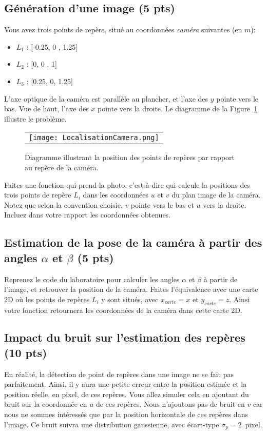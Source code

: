 \documentclass[12pt]{article}
\begin{document}
\subsection{Génération d'une image (5 pts)}
Vous avez trois points de repère, situé au coordonnées \emph{caméra} suivantes (en $m$):
\begin{itemize}
\item $L_1$ : [-0.25, 0 , 1.25]
\item $L_2$ : [0,       0   , 1]
\item $L_3$ : [0.25, 0, 1.25]
\end{itemize}
L'axe optique de la caméra est parallèle au plancher, et l'axe des $y$ pointe vers le bas. Vue de haut, l'axe des $x$ pointe vers la droite. Le diagramme de la Figure~\ref{DiagLocalisation} illustre le problème.

\begin{figure}[ht]
 \begin{center}
  \begin{tabular}{c}
    \texttt{[image: LocalisationCamera.png]} 
  \end{tabular}
 \end{center}
\vspace{-0.3in}
 \caption{Diagramme illustrant la position des points de repères par rapport au repère de la caméra.}
 \label{DiagLocalisation}
\end{figure}

Faites une fonction qui prend la photo, c'est-à-dire qui calcule la positions des trois points de repère $L_i$ dans les coordonnées $u$ et $v$ du plan image de la caméra. Notez que selon la convention choisie, $v$ pointe vers le bas et $u$ vers la droite. Incluez dans votre rapport les coordonnées obtenues.

\subsection{Estimation de la pose de la caméra à partir des angles $\alpha$ et $\beta$ (5 pts)}
Reprenez le code du laboratoire pour calculer les angles $\alpha$ et $\beta$ à partir de l'image, et retrouver la position de la caméra. Faites l'équivalence avec une carte 2D où les points de repères $L_i$ y sont situés, avec $x_{carte}=x$ et $y_{carte}=z$. Ainsi votre fonction retournera les coordonnées de la caméra dans cette carte 2D.

\subsection{Impact du bruit sur l'estimation des repères (10 pts)}
En réalité, la détection de point de repères dans une image ne se fait pas parfaitement. Ainsi, il y aura une petite erreur entre la position estimée et la position réelle, en pixel, de ces repères. Vous allez simuler cela en ajoutant du bruit sur la coordonnée en $u$ de ces repères. Nous n'ajoutons pas de bruit en $v$ car nous ne sommes intéressés que par la position horizontale de ces repères dans l'image. Ce bruit suivra une distribution gaussienne, avec écart-type $\sigma_p=2$~pixel.
\end{document}
